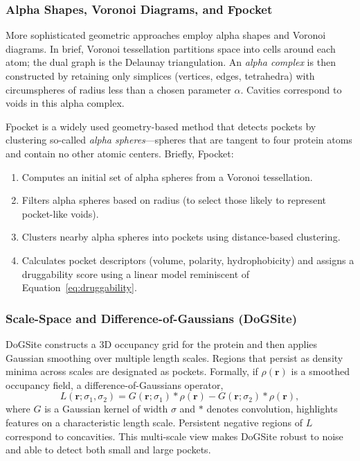 \documentclass[12pt,a4paper]{article}
\begin{document}
\subsubsection{Alpha Shapes, Voronoi Diagrams, and Fpocket}

More sophisticated geometric approaches employ alpha shapes and Voronoi diagrams. In brief, Voronoi tessellation partitions space into cells around each atom; the dual graph is the Delaunay triangulation. An \emph{alpha complex} is then constructed by retaining only simplices (vertices, edges, tetrahedra) with circumspheres of radius less than a chosen parameter \(\alpha\). Cavities correspond to voids in this alpha complex.\cite{CH5_LeGuilloux2009}

Fpocket is a widely used geometry-based method that detects pockets by clustering so-called \emph{alpha spheres}---spheres that are tangent to four protein atoms and contain no other atomic centers.\cite{CH5_LeGuilloux2009} Briefly, Fpocket:
\begin{enumerate}
    \item Computes an initial set of alpha spheres from a Voronoi tessellation.
    \item Filters alpha spheres based on radius (to select those likely to represent pocket-like voids).
    \item Clusters nearby alpha spheres into pockets using distance-based clustering.
    \item Calculates pocket descriptors (volume, polarity, hydrophobicity) and assigns a druggability score using a linear model reminiscent of Equation~\ref{eq:druggability}.
\end{enumerate}

\subsubsection{Scale-Space and Difference-of-Gaussians (DoGSite)}

DoGSite constructs a 3D occupancy grid for the protein and then applies Gaussian smoothing over multiple length scales.\cite{CH5_Volkamer2012} Regions that persist as density minima across scales are designated as pockets. Formally, if \(\rho(\mathbf{r})\) is a smoothed occupancy field, a difference-of-Gaussians operator,
\begin{equation}
L(\mathbf{r}; \sigma_1, \sigma_2) = G(\mathbf{r}; \sigma_1) * \rho(\mathbf{r}) - G(\mathbf{r}; \sigma_2) * \rho(\mathbf{r}),
\label{eq:dog}
\end{equation}
where \(G\) is a Gaussian kernel of width \(\sigma\) and \(*\) denotes convolution, highlights features on a characteristic length scale. Persistent negative regions of \(L\) correspond to concavities. This multi-scale view makes DoGSite robust to noise and able to detect both small and large pockets.\cite{CH5_Volkamer2012,CH5_zhao2020exploring}
\end{document}
